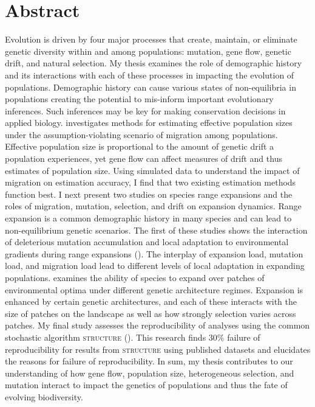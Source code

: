 \chapter*{Abstract}

Evolution is driven by four major processes that create, maintain, or eliminate genetic diversity within and among populations: mutation, gene flow, genetic drift, and natural selection. My thesis examines the role of demographic history and its interactions with each of these processes in impacting the evolution of populations. Demographic history can cause various states of non-equilibria in populations creating the potential to mis-inform important evolutionary inferences. Such inferences may be key for making conservation decisions in applied biology.  investigates methods for estimating effective population sizes under the assumption-violating scenario of migration among populations. Effective population size is proportional to the amount of genetic drift a population experiences, yet gene flow can affect measures of drift and thus estimates of population size. Using simulated data to understand the impact of migration on estimation accuracy, I find that two existing estimation methods function best. I next present two studies on species range expansions and the roles of migration, mutation, selection, and drift on expansion dynamics. Range expansion is a common demographic history in many species and can lead to non-equilibrium genetic scenarios. The first of these studies shows the interaction of deleterious mutation accumulation and local adaptation to environmental gradients during range expansions (). The interplay of expansion load, mutation load, and migration load lead to different levels of local adaptation in expanding populations.  examines the ability of species to expand over patches of environmental optima under different genetic architecture regimes. Expansion is enhanced by certain genetic architectures, and each of these interacts with the size of patches on the landscape as well as how strongly selection varies across patches. My final study assesses the reproducibility of analyses using the common stochastic algorithm \textsc{structure} (). This research finds $30\%$ failure of reproducibility for results from \textsc{structure} using published datasets and elucidates the reasons for failure of reproducibility. In sum, my thesis contributes to our understanding of how gene flow, population size, heterogeneous selection, and mutation interact to impact the genetics of populations and thus the fate of evolving biodiversity.





